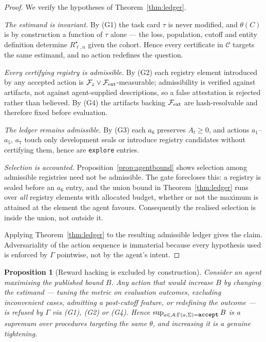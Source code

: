 \documentclass[11pt,a4paper]{article}
\newtheorem{proposition}[theorem]{Proposition}
\theoremstyle{definition}
\theoremstyle{remark}
\newcommand{\risk}{R^{\star}}
\newcommand{\Fcal}{\mathcal{F}}
\newcommand{\Acal}{\mathcal{A}}
\newcommand{\code}[1]{\texttt{\small#1}}
\begin{document}
\begin{proof}
We verify the hypotheses of Theorem~\ref{thm:ledger}.

\emph{The estimand is invariant.} By (G1) the task card $\tau$ is never modified, and $\theta(C)$ is by construction a function of $\tau$ alone --- the loss, population, cutoff and entity definition determine $\risk_{\ell,n}$ given the cohort. Hence every certificate in $\mathcal{C}$ targets the same estimand, and no action redefines the question.

\emph{Every certifying registry is admissible.} By (G2) each registry element introduced by any accepted action is $\Fcal_z\vee\Fcal_{\rm ext}$-measurable; admissibility is verified against artifacts, not against agent-supplied descriptions, so a false attestation is rejected rather than believed. By (G4) the artifacts backing $\Fcal_{\rm ext}$ are hash-resolvable and therefore fixed before evaluation.

\emph{The ledger remains admissible.} By (G3) each $a_6$ preserves $A_t\ge0$, and actions $a_1$--$a_5$, $a_7$ touch only development seals or introduce registry candidates without certifying them, hence are \code{explore} entries.

\emph{Selection is accounted.} Proposition~\ref{prop:agentbound} shows selection among admissible registries need not be admissible. The gate forecloses this: a registry is sealed before an $a_6$ entry, and the union bound in Theorem~\ref{thm:ledger} runs over \emph{all} registry elements with allocated budget, whether or not the maximum is attained at the element the agent favours. Consequently the realised selection is inside the union, not outside it.

Applying Theorem~\ref{thm:ledger} to the resulting admissible ledger gives the claim. Adversariality of the action sequence is immaterial because every hypothesis used is enforced by $\Gamma$ pointwise, not by the agent's intent. \end{proof}

\begin{proposition}[Reward hacking is excluded by construction]\label{prop:rewardhack}
Consider an agent maximising the published bound $B$. Any action that would increase $B$ by changing the estimand --- tuning the metric on evaluation outcomes, excluding inconvenient cases, admitting a post-cutoff feature, or redefining the outcome --- is refused by $\Gamma$ via (G1), (G2) or (G4). Hence $\sup_{a\in\Acal:\Gamma(a,\Sigma)=\code{accept}} B$ is a supremum over procedures targeting the \emph{same} $\theta$, and increasing it is a genuine tightening.
\end{proposition}
\end{document}
